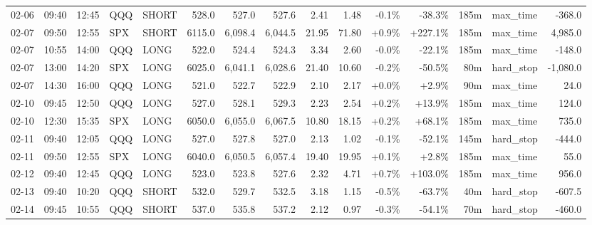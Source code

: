 \documentclass[11pt,a4paper,twoside]{article}
\begin{document}
\begin{landscape}
\begin{center}
\begin{longtable}{>{\color{txtmain}}l l l l l r r r r r r r r >{\color{txtmain}}l r}
02-06 & 09:40 & 12:45 & QQQ & SHORT & 528.0 & 527.0 & 527.6 & 2.41 & 1.48 & \textcolor{lossred}{-0.1\%} & \textcolor{lossred}{-38.3\%} & 185m & max\_time & \textcolor{lossred}{-368.0} \\
02-07 & 09:50 & 12:55 & SPX & SHORT & 6115.0 & 6,098.4 & 6,044.5 & 21.95 & 71.80 & \textcolor{wingreen}{+0.9\%} & \textcolor{wingreen}{+227.1\%} & 185m & max\_time & \textcolor{wingreen}{4,985.0} \\
02-07 & 10:55 & 14:00 & QQQ & LONG & 522.0 & 524.4 & 524.3 & 3.34 & 2.60 & \textcolor{lossred}{-0.0\%} & \textcolor{lossred}{-22.1\%} & 185m & max\_time & \textcolor{lossred}{-148.0} \\
02-07 & 13:00 & 14:20 & SPX & LONG & 6025.0 & 6,041.1 & 6,028.6 & 21.40 & 10.60 & \textcolor{lossred}{-0.2\%} & \textcolor{lossred}{-50.5\%} & 80m & hard\_stop & \textcolor{lossred}{-1,080.0} \\
02-07 & 14:30 & 16:00 & QQQ & LONG & 521.0 & 522.7 & 522.9 & 2.10 & 2.17 & \textcolor{wingreen}{+0.0\%} & \textcolor{wingreen}{+2.9\%} & 90m & max\_time & \textcolor{wingreen}{24.0} \\
02-10 & 09:45 & 12:50 & QQQ & LONG & 527.0 & 528.1 & 529.3 & 2.23 & 2.54 & \textcolor{wingreen}{+0.2\%} & \textcolor{wingreen}{+13.9\%} & 185m & max\_time & \textcolor{wingreen}{124.0} \\
02-10 & 12:30 & 15:35 & SPX & LONG & 6050.0 & 6,055.0 & 6,067.5 & 10.80 & 18.15 & \textcolor{wingreen}{+0.2\%} & \textcolor{wingreen}{+68.1\%} & 185m & max\_time & \textcolor{wingreen}{735.0} \\
02-11 & 09:40 & 12:05 & QQQ & LONG & 527.0 & 527.8 & 527.0 & 2.13 & 1.02 & \textcolor{lossred}{-0.1\%} & \textcolor{lossred}{-52.1\%} & 145m & hard\_stop & \textcolor{lossred}{-444.0} \\
02-11 & 09:50 & 12:55 & SPX & LONG & 6040.0 & 6,050.5 & 6,057.4 & 19.40 & 19.95 & \textcolor{wingreen}{+0.1\%} & \textcolor{wingreen}{+2.8\%} & 185m & max\_time & \textcolor{wingreen}{55.0} \\
02-12 & 09:40 & 12:45 & QQQ & LONG & 523.0 & 523.8 & 527.6 & 2.32 & 4.71 & \textcolor{wingreen}{+0.7\%} & \textcolor{wingreen}{+103.0\%} & 185m & max\_time & \textcolor{wingreen}{956.0} \\
02-13 & 09:40 & 10:20 & QQQ & SHORT & 532.0 & 529.7 & 532.5 & 3.18 & 1.15 & \textcolor{lossred}{-0.5\%} & \textcolor{lossred}{-63.7\%} & 40m & hard\_stop & \textcolor{lossred}{-607.5} \\
02-14 & 09:45 & 10:55 & QQQ & SHORT & 537.0 & 535.8 & 537.2 & 2.12 & 0.97 & \textcolor{lossred}{-0.3\%} & \textcolor{lossred}{-54.1\%} & 70m & hard\_stop & \textcolor{lossred}{-460.0} \\

\end{longtable}
\end{center}
\end{landscape}
\end{document}
